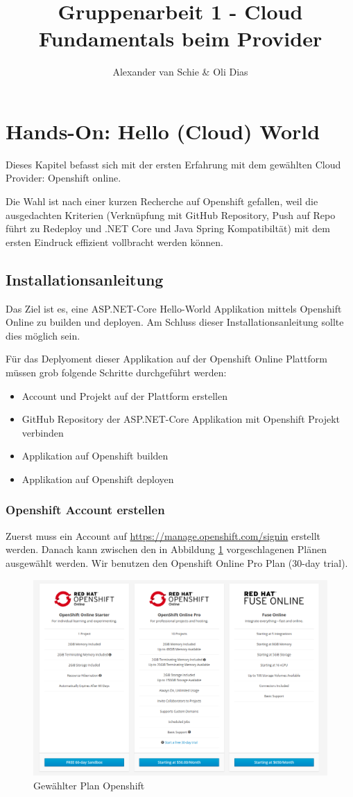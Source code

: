 \documentclass[12pt,a4paper]{article}
\author{Alexander van Schie \& Oli Dias}
\title{Gruppenarbeit 1 - Cloud Fundamentals beim Provider}
\begin{document}
\maketitle
\newpage
\tableofcontents
\newpage
\section{Hands-On: Hello (Cloud) World}
Dieses Kapitel befasst sich mit der ersten Erfahrung mit dem gewählten Cloud Provider: Openshift online. 

Die Wahl ist nach einer kurzen Recherche auf Openshift gefallen, weil die ausgedachten Kriterien (Verknüpfung mit GitHub Repository, Push auf Repo führt zu Redeploy und .NET Core und Java Spring Kompatibiltät) mit dem ersten Eindruck effizient vollbracht werden können. 
\subsection{Installationsanleitung}
Das Ziel ist es, eine ASP.NET-Core Hello-World Applikation mittels Openshift Online zu builden und deployen. Am Schluss dieser Installationsanleitung sollte dies möglich sein.


Für das Deplyoment dieser Applikation auf der Openshift Online Plattform müssen grob folgende Schritte durchgeführt werden:
\begin{itemize}
	\item Account und Projekt auf der Plattform erstellen
	\item GitHub Repository der ASP.NET-Core Applikation mit Openshift Projekt verbinden
	\item Applikation auf Openshift builden
	\item Applikation auf Openshift deployen
\end{itemize}
\subsubsection{Openshift Account erstellen}
Zuerst muss ein Account auf  \url{https://manage.openshift.com/signin} erstellt werden. Danach kann zwischen den in Abbildung \ref{fig:openshift-plan} vorgeschlagenen Plänen ausgewählt werden. Wir benutzen den Openshift Online Pro Plan (30-day trial).
\begin{figure}[h]
	\centering
	\includegraphics[width=0.7\linewidth]{img/openshift-plan}
	\caption{Gewählter Plan Openshift}
	\label{fig:openshift-plan}
\end{figure}
\end{document}
